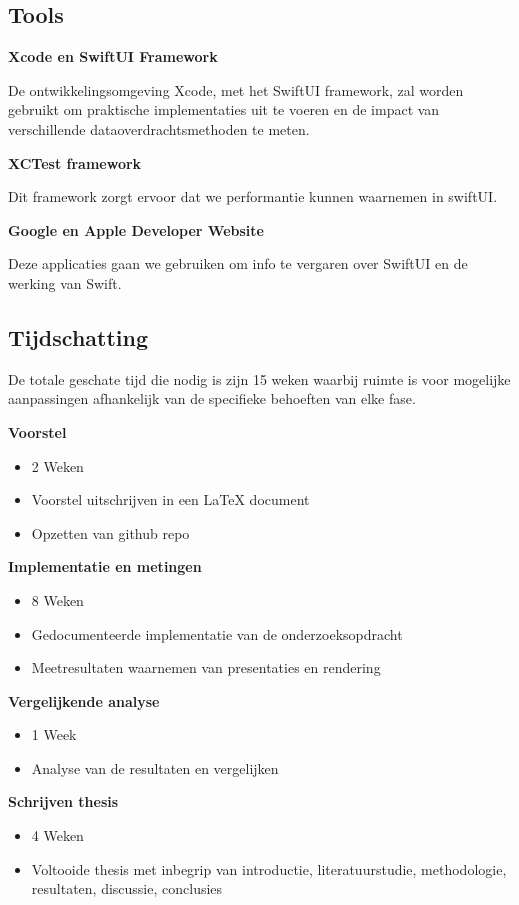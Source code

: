 \subsection{Tools}
\textbf{Xcode en SwiftUI Framework}

De ontwikkelingsomgeving Xcode, met het SwiftUI framework, zal worden gebruikt om praktische implementaties uit te voeren en de impact van verschillende dataoverdrachtsmethoden te meten.

\textbf{XCTest framework}

Dit framework zorgt ervoor dat we performantie kunnen waarnemen in swiftUI.

\textbf{Google en Apple Developer Website}

Deze applicaties gaan we gebruiken om info te vergaren over SwiftUI en de werking van Swift.


\subsection{Tijdschatting}
De totale geschate tijd die nodig is zijn 15 weken waarbij ruimte is voor mogelijke aanpassingen afhankelijk van de specifieke behoeften van elke fase.

\textbf{Voorstel}
\begin{itemize}
    \item {2 Weken}
    \item {Voorstel uitschrijven in een LaTeX document}
    \item {Opzetten van github repo}
\end{itemize}

\textbf{Implementatie en metingen}
\begin{itemize}
    \item {8 Weken}
    \item {Gedocumenteerde implementatie van de onderzoeksopdracht}
    \item {Meetresultaten waarnemen van presentaties en rendering}
\end{itemize}

\textbf{Vergelijkende analyse}
\begin{itemize}
    \item {1 Week}
    \item {Analyse van de resultaten en vergelijken}
\end{itemize}

\textbf{Schrijven thesis}
\begin{itemize}
    \item {4 Weken}
    \item {Voltooide thesis met inbegrip van introductie, literatuurstudie, methodologie, resultaten, discussie, conclusies}
\end{itemize}



